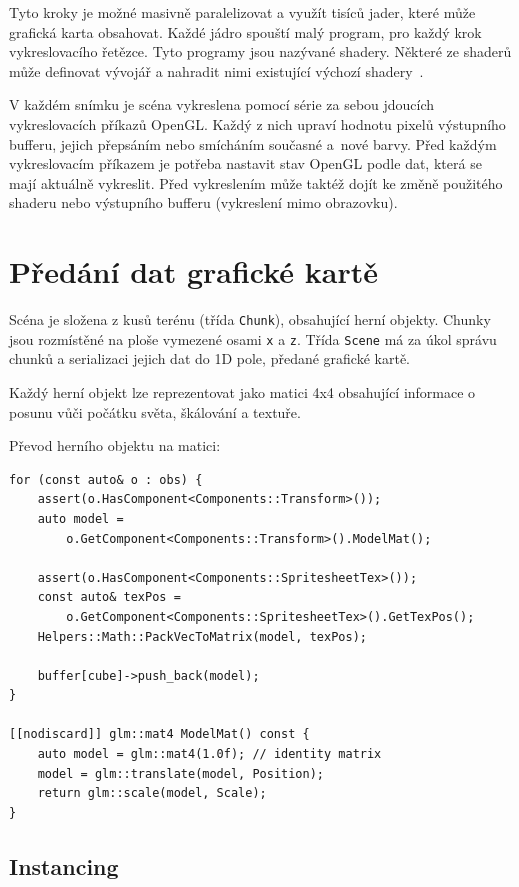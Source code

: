 \documentclass[thesis=M,czech]{FITthesis}[2019/12/23]
\begin{document}
Tyto kroky je možné masivně paralelizovat a využít tisíců jader, které může grafická karta obsahovat. Každé jádro spouští malý program, pro každý krok vykreslovacího řetězce. Tyto programy jsou nazývané shadery. Některé ze shaderů může definovat vývojář a nahradit nimi existující výchozí shadery~\cite{lopgl_triangle}.

V každém snímku je scéna vykreslena pomocí série za sebou jdoucích vykreslovacích příkazů OpenGL. Každý z nich upraví hodnotu pixelů výstupního bufferu, jejich přepsáním nebo smícháním současné a~nové barvy. Před každým vykreslovacím příkazem je potřeba nastavit stav OpenGL podle dat, která se mají aktuálně vykreslit. Před vykreslením může taktéž dojít ke změně použitého shaderu nebo výstupního bufferu (vykreslení mimo obrazovku).

\section{Předání dat grafické kartě}

Scéna je složena z kusů terénu (třída \texttt{Chunk}), obsahující herní objekty. Chunky jsou rozmístěné na ploše vymezené osami \texttt{x} a \texttt{z}. Třída \texttt{Scene} má za úkol správu chunků a serializaci jejich dat do 1D pole, předané grafické kartě.

Každý herní objekt lze reprezentovat jako matici 4x4 obsahující informace o posunu vůči počátku světa, škálování a textuře.


Převod herního objektu na matici:

\begin{verbatim}
for (const auto& o : obs) {
    assert(o.HasComponent<Components::Transform>());
    auto model =
        o.GetComponent<Components::Transform>().ModelMat();

    assert(o.HasComponent<Components::SpritesheetTex>());
    const auto& texPos = 
        o.GetComponent<Components::SpritesheetTex>().GetTexPos();
    Helpers::Math::PackVecToMatrix(model, texPos);

    buffer[cube]->push_back(model);
}

[[nodiscard]] glm::mat4 ModelMat() const {
    auto model = glm::mat4(1.0f); // identity matrix
    model = glm::translate(model, Position);
    return glm::scale(model, Scale);
}
\end{verbatim}

\subsection{Instancing}
\end{document}
